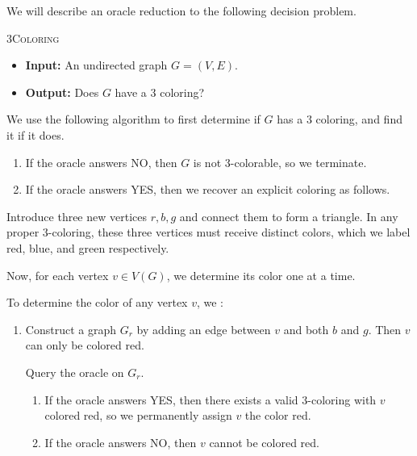 \documentclass[12pt]{article}
\begin{document}
\begin{solution}
    \bbni

    We will describe an oracle reduction to the following decision problem.

    \begin{tcolorbox}
        \textsc{3Coloring}
        \begin{itemize}
            \item \textbf{Input:} An undirected graph $G=(V,E)$. 
            \item \textbf{Output:} Does $G$ have a $3$ coloring? 
        \end{itemize}
    \end{tcolorbox}

    We use the following algorithm to first determine if $G$ has a $3$ coloring, and find it if it does. 

    \begin{enumerate}
        \item If the oracle answers NO, then $G$ is not $3$-colorable, so we terminate.
        \item If the oracle answers YES, then we recover an explicit coloring as follows.
    \end{enumerate}

    Introduce three new vertices $r,b,g$ and connect them to form a triangle. In any proper $3$-coloring, these three vertices must receive distinct colors, which we label red, blue, and green respectively.

    Now, for each vertex $v \in V(G)$, we determine its color one at a time.

    To determine the color of any vertex $v$, we :

    \begin{enumerate}
        \item Construct a graph $G_r$ by adding an edge between $v$ and both $b$ and $g$. Then $v$ can only be colored red.
        
        Query the oracle on $G_r$.
        
        \begin{enumerate}
            \item If the oracle answers YES, then there exists a valid $3$-coloring with $v$ colored red, so we permanently assign $v$ the color red.
            \item If the oracle answers NO, then $v$ cannot be colored red.
        \end{enumerate}


\end{enumerate}
\end{solution}
\end{document}
